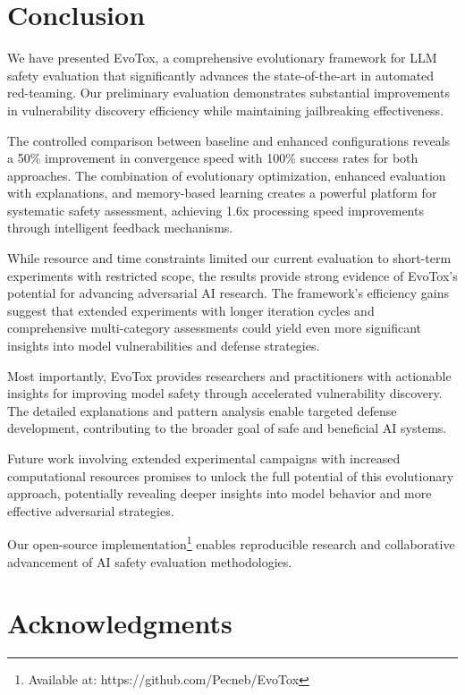 \documentclass[11pt,twocolumn]{article}
\begin{document}
\section{Conclusion}

We have presented EvoTox, a comprehensive evolutionary framework for LLM safety evaluation that significantly advances the state-of-the-art in automated red-teaming. Our preliminary evaluation demonstrates substantial improvements in vulnerability discovery efficiency while maintaining jailbreaking effectiveness.

The controlled comparison between baseline and enhanced configurations reveals a 50\% improvement in convergence speed with 100\% success rates for both approaches. The combination of evolutionary optimization, enhanced evaluation with explanations, and memory-based learning creates a powerful platform for systematic safety assessment, achieving 1.6x processing speed improvements through intelligent feedback mechanisms.

While resource and time constraints limited our current evaluation to short-term experiments with restricted scope, the results provide strong evidence of EvoTox's potential for advancing adversarial AI research. The framework's efficiency gains suggest that extended experiments with longer iteration cycles and comprehensive multi-category assessments could yield even more significant insights into model vulnerabilities and defense strategies.

Most importantly, EvoTox provides researchers and practitioners with actionable insights for improving model safety through accelerated vulnerability discovery. The detailed explanations and pattern analysis enable targeted defense development, contributing to the broader goal of safe and beneficial AI systems.

Future work involving extended experimental campaigns with increased computational resources promises to unlock the full potential of this evolutionary approach, potentially revealing deeper insights into model behavior and more effective adversarial strategies.

Our open-source implementation\footnote{Available at: https://github.com/Pecneb/EvoTox} enables reproducible research and collaborative advancement of AI safety evaluation methodologies.

\section*{Acknowledgments}
\end{document}
